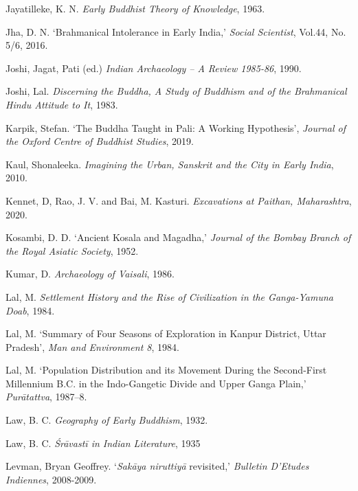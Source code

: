 \label{footprints_split_022.html_Jayatillekeux201963}
Jayatilleke, K. N. \emph{Early Buddhist Theory of Knowledge}, 1963.

Jha, D. N. `Brahmanical Intolerance in Early India,' \emph{Social
Scientist}, Vol.44, No. 5/6, 2016.

\label{footprints_split_022.html_Joshiux201990}
Joshi, Jagat, Pati (ed.) \emph{Indian Archaeology -- A Review 1985-86},
1990.

Joshi, Lal. \emph{Discerning the Buddha, A Study of Buddhism and of the
Brahmanical Hindu Attitude to It}, 1983.

\label{footprints_split_022.html_Karpikux202019}
Karpik, Stefan. `The Buddha Taught in Pali: A Working Hypothesis',
\emph{Journal of the Oxford Centre of Buddhist Studies}, 2019.

\label{footprints_split_022.html_Kaulux202010}
Kaul, Shonaleeka. \emph{Imagining the Urban, Sanskrit and the City in
Early India}, 2010.

\label{footprints_split_022.html_Kennetux20Raoux20Baiux202020}
Kennet, D, Rao, J. V. and Bai, M. Kasturi. \emph{Excavations at Paithan,
Maharashtra}, 2020.

Kosambi, D. D. `Ancient Kosala and Magadha,' \emph{Journal of the Bombay
Branch of the Royal Asiatic Society}, 1952.

Kumar, D. \emph{Archaeology of Vaisali}, 1986.

\label{footprints_split_022.html_Lalux201984a}
Lal, M. \emph{Settlement History and the Rise of Civilization in the
Ganga-Yamuna Doab}, 1984.

\label{footprints_split_022.html_Lalux201984b}
Lal, M. `Summary of Four Seasons of Exploration in Kanpur District,
Uttar Pradesh', \emph{Man and Environment 8}, 1984.

Lal, M. `Population Distribution and its Movement During the
Second-First Millennium B.C. in the Indo-Gangetic Divide and Upper Ganga
Plain,' \emph{Purātattva}, 1987--8.

Law, B. C. \emph{Geography of Early Buddhism}, 1932.

\label{footprints_split_022.html_Lawux201935}
Law, B. C. \emph{Śrāvastī in Indian Literature}, 1935

\label{footprints_split_022.html_Levmanux202008}
Levman, Bryan Geoffrey. `\emph{Sakāya niruttiyā} revisited,'
\emph{Bulletin D'Etudes Indiennes}, 2008-2009.

